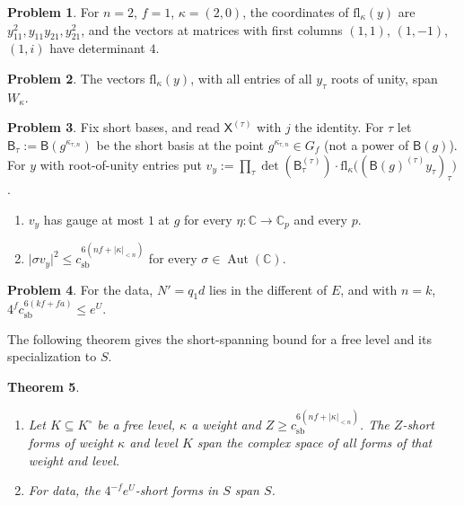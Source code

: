 \documentclass[reqno]{amsart}
\theoremstyle{definition}
\newtheorem{problem}{Problem}[section]
\theoremstyle{plain}
\newtheorem{theorem}[problem]{Theorem}
\theoremstyle{remark}
\newcommand{\C}{\mathbb{C}}
\newcommand{\Aut}{\operatorname{Aut}}
\newcommand{\B}{\mathsf{B}}
\newcommand{\csb}{c_{\mathrm{sb}}}
\newcommand{\fl}{\mathrm{fl}}
\newcommand{\Ko}{K^\circ}
\begin{document}
\begin{problem}\label{pr:sym2}
For \(n=2\), \(f=1\), \(\kappa=(2,0)\), the coordinates of \(\fl_\kappa(y)\) are \(y_{11}^2,y_{11}y_{21},y_{21}^2\), and the vectors at matrices with first columns \((1,1)\), \((1,-1)\), \((1,i)\) have determinant \(4\).
\end{problem}

\begin{problem}\label{pr:eval-span}
The vectors \(\fl_\kappa(y)\), with all entries of all \(y_\tau\) roots of unity, span \(W_\kappa\).
\end{problem}

\begin{problem}\label{pr:eval-short}
Fix short bases, and read \(\mathsf X^{(\tau)}\) with \(j\) the identity.  For \(\tau\) let \(\B_\tau:=\B(g^{\kappa_{\tau,n}})\) be the short basis at the point \(g^{\kappa_{\tau,n}}\in G_f\) (not a power of \(\B(g)\)).  For \(y\) with root-of-unity entries put \(v_y:=\prod_\tau\det(\B_\tau^{(\tau)})\cdot\fl_\kappa\bigl((\B(g)^{(\tau)}y_\tau)_\tau\bigr)\).
\begin{enumerate}
\item[(a)] \(v_y\) has gauge at most \(1\) at \(g\) for every \(\eta\colon\C\to\C_p\) and every \(p\).
\item[(b)] \(\lvert\sigma v_y\rvert^2\le\csb^{6(nf+\lvert\kappa\rvert_{<n})}\) for every \(\sigma\in\Aut(\C)\).
\end{enumerate}
\end{problem}

\begin{problem}\label{pr:data-bound}
For the data, \(N'=q_1d\) lies in the different of \(E\), and with \(n=k\), \(4^f\csb^{6(kf+fa)}\le e^U\).
\end{problem}

The following theorem gives the short-spanning bound for a free level and its specialization to \(S\).

\begin{theorem}\label{thm:short-span}
\begin{enumerate}
\item[(a)] Let \(K\subseteq\Ko\) be a free level, \(\kappa\) a weight and \(Z\ge\csb^{6(nf+\lvert\kappa\rvert_{<n})}\).  The \(Z\)-short forms of weight \(\kappa\) and level \(K\) span the complex space of all forms of that weight and level.
\item[(b)] For data, the \(4^{-f}e^U\)-short forms in \(S\) span \(S\).
\end{enumerate}
\end{theorem}
\end{document}
